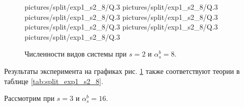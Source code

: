 \begin{figure}[H]
    \centering
       {pictures/split/exp1_s2_8/Q}{.3}
      {pictures/split/exp1_s2_8/Q}{.3}
      {pictures/split/exp1_s2_8/Q}{.3}
      {pictures/split/exp1_s2_8/Q}{.3}
      {pictures/split/exp1_s2_8/Q}{.3}
     {pictures/split/exp1_s2_8/Q}{.3}
     {pictures/split/exp1_s2_8/Q}{.3}
\caption{Численности видов системы при \(s=2\) и \(\alpha^b_s = 8\).} \label{fig:split_exp1_s2_8}
\end{figure}
Результаты эксперимента на графиках рис. \ref{fig:split_exp1_s2_8} также соответствуют теории в таблице \ref{tab:split_exp1_s2_8}.

Рассмотрим при \(s=3\) и \(\alpha^b_s = 16\). 
